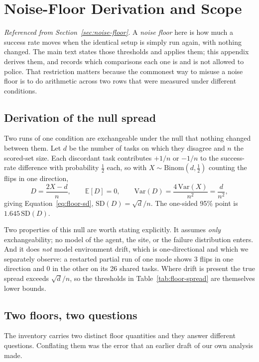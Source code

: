 \chapter{Noise-Floor Derivation and Scope}
\label{app:noise}

\emph{Referenced from Section~\ref{sec:noise-floor}.} A \emph{noise floor}
here is how much a success rate moves when the identical setup is simply run
again, with nothing changed. The main text states those thresholds and applies
them; this appendix derives them, and records which comparisons each one is
and is not allowed to police. That restriction matters because the commonest
way to misuse a noise floor is to do arithmetic across two rows that were
measured under different conditions.

\section{Derivation of the null spread}

Two runs of one condition are exchangeable under the null that nothing changed
between them. Let $d$ be the number of tasks on which they disagree and $n$ the
scored-set size. Each discordant task contributes $+1/n$ or $-1/n$ to the
success-rate difference with probability $\tfrac12$ each, so with
$X\sim\mathrm{Binom}(d,\tfrac12)$ counting the flips in one direction,
\[
  D = \frac{2X-d}{n},\qquad
  \mathbb{E}[D]=0,\qquad
  \mathrm{Var}(D)=\frac{4\,\mathrm{Var}(X)}{n^{2}}=\frac{d}{n^{2}},
\]
giving Equation~\ref{eq:floor-sd}, $\mathrm{SD}(D)=\sqrt{d}/n$. The one-sided
95\% point is $1.645\,\mathrm{SD}(D)$.

Two properties of this null are worth stating explicitly. It assumes \emph{only} exchangeability; no model of the agent, the site, or the failure distribution enters. And it does \emph{not} model environment drift, which is
one-directional and which we separately observe: a restarted partial run of one
mode shows 3 flips in one direction and 0 in the other on its 26 shared tasks.
Where drift is present the true spread exceeds $\sqrt{d}/n$, so the thresholds
in Table~\ref{tab:floor-spread} are themselves lower bounds.

\section{Two floors, two questions}

The inventory carries two distinct floor quantities and they answer different
questions. Conflating them was the error that an earlier draft of our own
analysis made.


